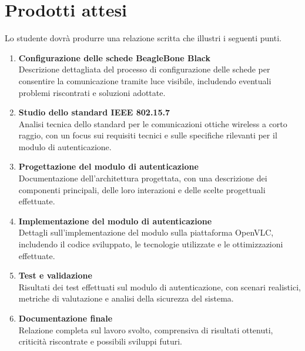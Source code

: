 \section*{Prodotti attesi}
Lo studente dovrà produrre una relazione scritta che illustri i seguenti punti.
\begin{enumerate}
    \item \textbf{Configurazione delle schede BeagleBone Black} \\
    Descrizione dettagliata del processo di configurazione delle schede per consentire la comunicazione tramite luce visibile, includendo eventuali problemi riscontrati e soluzioni adottate.
    
    \item \textbf{Studio dello standard IEEE 802.15.7} \\
    Analisi tecnica dello standard per le comunicazioni ottiche wireless a corto raggio, con un focus sui requisiti tecnici e sulle specifiche rilevanti per il modulo di autenticazione.
    
    \item \textbf{Progettazione del modulo di autenticazione} \\
    Documentazione dell'architettura progettata, con una descrizione dei componenti principali, delle loro interazioni e delle scelte progettuali effettuate.
    
    \item \textbf{Implementazione del modulo di autenticazione} \\
    Dettagli sull'implementazione del modulo sulla piattaforma OpenVLC, includendo il codice sviluppato, le tecnologie utilizzate e le ottimizzazioni effettuate.
    
    \item \textbf{Test e validazione} \\
    Risultati dei test effettuati sul modulo di autenticazione, con scenari realistici, metriche di valutazione e analisi della sicurezza del sistema.
    
    \item \textbf{Documentazione finale} \\
    Relazione completa sul lavoro svolto, comprensiva di risultati ottenuti, criticità riscontrate e possibili sviluppi futuri.
\end{enumerate}

